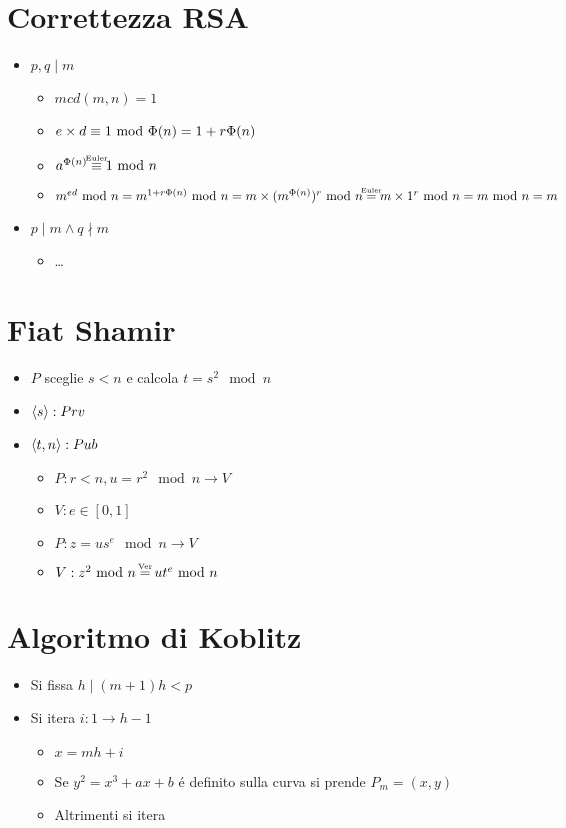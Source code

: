 \newpage
\section{Correttezza RSA}

\begin{itemize}
    \item $p, q \mid m$
    \begin{itemize}
        \item $mcd(m, n) = 1$
        \item $e \times d \equiv 1 \ \mathbf{\mathrm{mod}}\ {\Phi(n)} = 1 + r{\Phi(n)}$
        \item $a^\Pn \dequiv{Euler} 1 \mod{n}$
        \item $m^{ed} \mod{n} = m^{1 + r\Pn} \mod{n} = m \times (m^\Pn)^r  \mod{n} \de{Euler} m \times 1^r \mod{n} = m \mod{n} = m$
    \end{itemize}
    \item $p \mid m \wedge q \nmid m$
    \begin{itemize}
        \item \dots
    \end{itemize}
\end{itemize}

\section{Fiat Shamir}

\begin{itemize}
    \item $P$ sceglie $s < n$ e calcola $t = s^2 \mod{n}$
    \item ${\langle s \rangle}: Prv$
    \item ${\langle t, n \rangle}: Pub$
    \begin{itemize}
        \item $P: r < n, u = r^2 \mod{n} \to V$
        \item $V: e \in [0, 1]$
        \item $P: z = us^e \mod{n} \to V$
        \item $V: z^2 \mod{n} \de{Ver} ut^e \mod{n}$
    \end{itemize}
\end{itemize}

\section{Algoritmo di Koblitz}

\begin{itemize}
    \item Si fissa $h \mid (m+1)h < p$
    \item Si itera $i : 1 \to h-1$
    \begin{itemize}
        \item $x = mh + i$
        \item Se $y^2 = x^3 + ax + b$ \'e definito sulla curva si prende $P_m = (x, y)$
        \item Altrimenti si itera
    \end{itemize}
\end{itemize}


